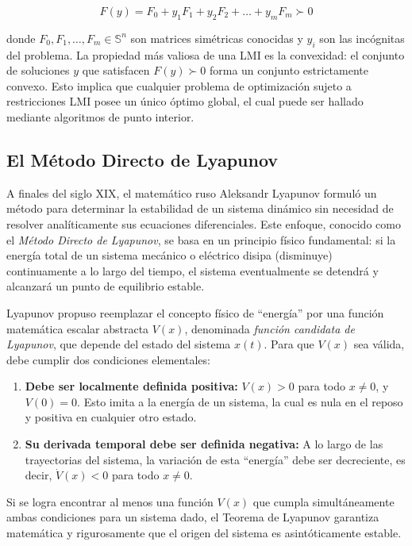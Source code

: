 \begin{equation}
    F(y) = F_0 + y_1 F_1 + y_2 F_2 + \dots + y_m F_m \succ 0
    \label{eq:lmi_canonica}
\end{equation}

donde $F_0, F_1, \dots, F_m \in \mathbb{S}^n$ son matrices simétricas conocidas y $y_i$ son las incógnitas del problema. La propiedad más valiosa de una LMI es la convexidad: el conjunto de soluciones $y$ que satisfacen $F(y) \succ 0$ forma un conjunto estrictamente convexo. Esto implica que cualquier problema de optimización sujeto a restricciones LMI posee un único óptimo global, el cual puede ser hallado mediante algoritmos de punto interior.

\subsection{El Método Directo de Lyapunov}

A finales del siglo XIX, el matemático ruso Aleksandr Lyapunov formuló un método para determinar la estabilidad de un sistema dinámico sin necesidad de resolver analíticamente sus ecuaciones diferenciales. Este enfoque, conocido como el \textit{Método Directo de Lyapunov}, se basa en un principio físico fundamental: si la energía total de un sistema mecánico o eléctrico disipa (disminuye) continuamente a lo largo del tiempo, el sistema eventualmente se detendrá y alcanzará un punto de equilibrio estable.

Lyapunov propuso reemplazar el concepto físico de ``energía'' por una función matemática escalar abstracta $V(x)$, denominada \textit{función candidata de Lyapunov}, que depende del estado del sistema $x(t)$. Para que $V(x)$ sea válida, debe cumplir dos condiciones elementales:

\begin{enumerate}
    \item \textbf{Debe ser localmente definida positiva:} $V(x) > 0$ para todo $x \neq 0$, y $V(0) = 0$. Esto imita a la energía de un sistema, la cual es nula en el reposo y positiva en cualquier otro estado.
    \item \textbf{Su derivada temporal debe ser definida negativa:} A lo largo de las trayectorias del sistema, la variación de esta ``energía'' debe ser decreciente, es decir, $\dot{V}(x) < 0$ para todo $x \neq 0$.
\end{enumerate}

Si se logra encontrar al menos una función $V(x)$ que cumpla simultáneamente ambas condiciones para un sistema dado, el Teorema de Lyapunov garantiza matemática y rigurosamente que el origen del sistema es asintóticamente estable.

